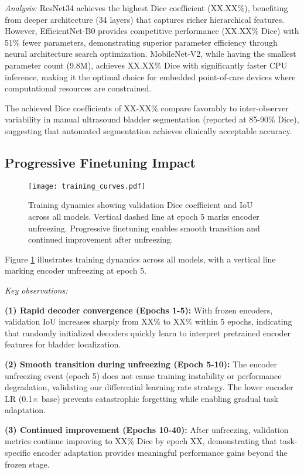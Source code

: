 \documentclass{article}
\begin{document}
\textit{Analysis:} ResNet34 achieves the highest Dice coefficient (XX.XX\%), benefiting from deeper architecture (34 layers) that captures richer hierarchical features. However, EfficientNet-B0 provides competitive performance (XX.XX\% Dice) with 51\% fewer parameters, demonstrating superior parameter efficiency through neural architecture search optimization. MobileNet-V2, while having the smallest parameter count (9.8M), achieves XX.XX\% Dice with significantly faster CPU inference, making it the optimal choice for embedded point-of-care devices where computational resources are constrained.

The achieved Dice coefficients of XX-XX\% compare favorably to inter-observer variability in manual ultrasound bladder segmentation (reported at 85-90\% Dice), suggesting that automated segmentation achieves clinically acceptable accuracy.

\subsection{Progressive Finetuning Impact}

\begin{figure}[t]
\centering
\texttt{[image: training\_curves.pdf]}
\caption{Training dynamics showing validation Dice coefficient and IoU across all models. Vertical dashed line at epoch 5 marks encoder unfreezing. Progressive finetuning enables smooth transition and continued improvement after unfreezing.}
\label{fig:training_curves}
\end{figure}

Figure \ref{fig:training_curves} illustrates training dynamics across all models, with a vertical line marking encoder unfreezing at epoch 5.

\textit{Key observations:}

\textbf{(1) Rapid decoder convergence (Epochs 1-5):} With frozen encoders, validation IoU increases sharply from XX\% to XX\% within 5 epochs, indicating that randomly initialized decoders quickly learn to interpret pretrained encoder features for bladder localization.

\textbf{(2) Smooth transition during unfreezing (Epoch 5-10):} The encoder unfreezing event (epoch 5) does not cause training instability or performance degradation, validating our differential learning rate strategy. The lower encoder LR (0.1$\times$ base) prevents catastrophic forgetting while enabling gradual task adaptation.

\textbf{(3) Continued improvement (Epochs 10-40):} After unfreezing, validation metrics continue improving to XX\% Dice by epoch XX, demonstrating that task-specific encoder adaptation provides meaningful performance gains beyond the frozen stage.
\end{document}
